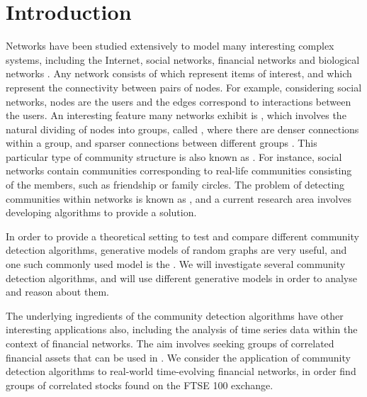 
\chapter{Introduction}

\label{cha:introduction}


Networks have been studied extensively to model many interesting complex systems, including the Internet, social networks, financial networks and biological networks \cite{New06a,DKM+13,MG13}.
Any network consists of  which represent items of interest, and  which represent the connectivity between pairs of nodes. For example, considering social networks, nodes are the users and the edges correspond to interactions between the users.
An interesting feature many networks exhibit is , which involves the natural dividing of nodes into groups, called , where there are denser connections within a group, and sparser connections between different groups \cite{New06a,DKM+13,For10,New06b}. This particular type of community structure is also known as  \cite{DKM+13}. For instance, social networks contain communities corresponding to real-life communities consisting of the members, such as friendship or family circles.
The problem of detecting communities within networks is known as , and a current research area involves developing algorithms to provide a solution.

In order to provide a theoretical setting to test and compare different community detection algorithms, generative models of random graphs are very useful, and one such commonly used model is the  \cite{DKM+13,NN12}. We will investigate several community detection algorithms, and will use different generative models in order to analyse and reason about them.

The underlying ingredients of the community detection algorithms have other interesting applications also, including the analysis of time series data within the context of financial networks. The aim involves seeking groups of correlated financial assets that can be used in .
We consider the application of community detection algorithms to real-world time-evolving financial networks, in order find groups of correlated stocks found on the FTSE 100 exchange.

